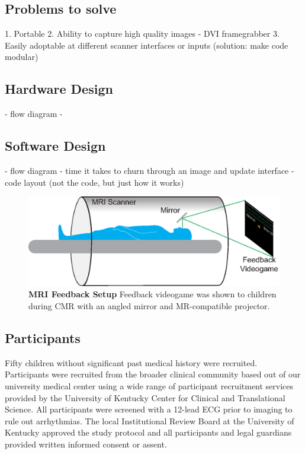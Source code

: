\subsection{Problems to solve}
1. Portable
2. Ability to capture high quality images - DVI framegrabber
3. Easily adoptable at different scanner interfaces or inputs (solution: make code modular)

\subsection{Hardware Design}
- flow diagram
- 

\subsection{Software Design}
- flow diagram
- time it takes to churn through an image and update interface
- code layout (not the code, but just how it works)

\begin{figure} 
	\includegraphics{figures/gamepaper/02-feedback_videogame_in_mri}
	\caption[MRI Feedback Setup]{\textbf{MRI Feedback Setup} Feedback videogame was shown to children during CMR with an angled mirror and MR-compatible projector.}
	\label{fig:MRI_feedback}
\end{figure}

\subsection{Participants}
	Fifty children without significant past medical history were recruited. Participants were recruited from the broader clinical community based out of our university medical center using a wide range of participant recruitment services provided by the University of Kentucky Center for Clinical and Translational Science. All participants were screened with a 12-lead ECG prior to imaging to rule out arrhythmias. The local Institutional Review Board at the University of Kentucky approved the study protocol and all participants and legal guardians provided written informed consent or assent.

